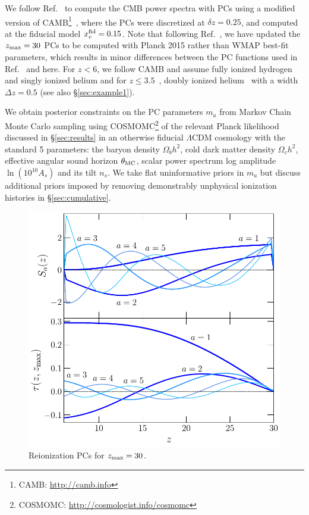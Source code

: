 \documentclass[prd,twocolumn,amsmath,amssymb,floatfix,superscriptaddress,nofootinbib]{revtex4-1}
\newcommand{\zmax}{z_{\rm max}}
\begin{document}
We follow Ref.~\cite{Heinrich:2018btc} to compute the CMB power spectra with PCs using a modified version of CAMB\footnote{CAMB: \url{http://camb.info}}~\cite{Lewis:1999bs, Howlett:2012mh}, where the PCs were discretized at $\delta z = 0.25$, and computed at the fiducial model $x_e^{\rm fid} = 0.15$. Note that following Ref.~\cite{Heinrich:2018btc}, we have updated the $\zmax = 30$ PCs to be computed with Planck 2015 rather than WMAP best-fit parameters, which results in minor differences between the PC functions used in Ref.~\cite{Heinrich:2016ojb} and here. For $z<6$, we follow CAMB and assume fully ionized hydrogen and singly ionized helium and for $z\leq 3.5$~\cite{Becker:2010cu}, doubly ionized helium~\cite{Becker:2010cu} with a width $\Delta z = 0.5$ (see also \S \ref{sec:example1}).

We obtain posterior constraints on the PC parameters $m_a$ from Markov Chain Monte Carlo sampling using COSMOMC\footnote{COSMOMC: \url{http://cosmologist.info/cosmomc}} of the relevant Planck likelihood discussed in \S \ref{sec:results} in an otherwise fiducial $\Lambda$CDM cosmology with the standard 5 parameters: the baryon density $\Omega_b h^2$, cold dark matter density 
$\Omega_c h^2$, effective angular sound horizon $\theta_{\rm MC}$, scalar power spectrum log amplitude $\ln (10^{10} A_s)$ and
its tilt $n_s$.  We take flat uninformative
priors in $m_a$ but discuss additional priors imposed by
removing demonstrably  unphysical ionization histories in \S \ref{sec:cumulative}.

 \begin{figure}
          \includegraphics[width=0.95\columnwidth]{paper/plots/pl18_plot_pub_xe_basis_tau_basis_zmax30_heinrich.pdf}
          \caption{Reionization PCs for $\zmax = 30$.} 
          \label{fig:xe}
\end{figure}
 
\end{document}
